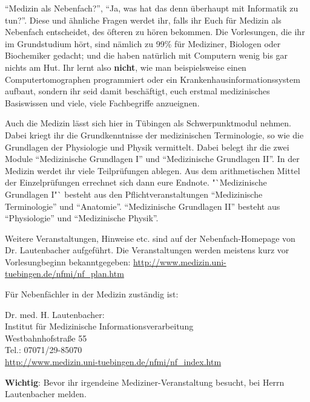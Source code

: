 "`Medizin als Nebenfach?"', "`Ja, was hat das denn überhaupt mit Informatik
  zu tun?"'. Diese und ähnliche Fragen werdet ihr, falls ihr
  Euch für Medizin als Nebenfach
  entscheidet, des öfteren zu hören bekommen.
  Die Vorlesungen, die ihr im Grundstudium hört, sind
  nämlich zu 99\% für Mediziner, Biologen oder Biochemiker gedacht; und die
  haben natürlich mit Computern wenig bis gar nichts am Hut. Ihr 
  lernt also \textbf{nicht}, wie man beispielsweise einen Computertomographen
  programmiert oder ein Krankenhausinformationssystem aufbaut, sondern ihr seid
  damit beschäftigt, euch erstmal medizinisches Basiswissen und viele, viele
  Fachbegriffe anzueignen. 


Auch die Medizin lässt sich hier in Tübingen als Schwerpunktmodul nehmen. Dabei kriegt ihr die Grundkenntnisse der medizinischen Terminologie, so wie die Grundlagen der Physiologie und Physik vermittelt. Dabei belegt ihr die zwei Module "`Medizinische Grundlagen I"' und "`Medizinische Grundlagen II"'. In der Medizin werdet ihr viele Teilprüfungen ablegen. Aus dem arithmetischen Mittel der Einzelprüfungen errechnet sich dann eure Endnote. "`Medizinische Grundlagen I"` besteht aus den Pflichtveranstaltungen "`Medizinische Terminologie"' und "`Anatomie"'. "`Medizinische Grundlagen II"' besteht aus "`Physiologie"' und "`Medizinische Physik"'.

Weitere Veranstaltungen, Hinweise etc. sind auf der Nebenfach-Homepage von
Dr. Lautenbacher aufgeführt. Die Veranstaltungen werden meistens kurz vor
Vorlesungbeginn bekanntgegeben:
\url{http://www.medizin.uni-tuebingen.de/nfmi/nf_plan.htm}


Für Nebenfächler in der Medizin zuständig ist:

Dr. med. H. Lautenbacher: \\
Institut für Medizinische Informationsverarbeitung \\
Westbahnhofstraße 55 \\
Tel.: 07071/29-85070 \\
\url{http://www.medizin.uni-tuebingen.de/nfmi/nf_index.htm}


\textbf{Wichtig}: Bevor ihr irgendeine Mediziner-Veranstaltung besucht, bei Herrn Lautenbacher melden.
